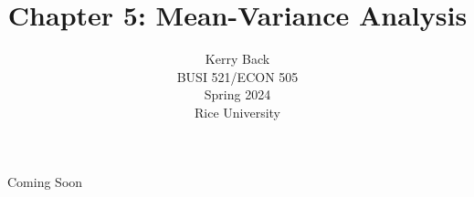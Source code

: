 \documentclass[10pt]{beamer}
\title{Chapter 5: Mean-Variance Analysis}
\date{}
\author{Kerry Back\\ 
BUSI 521/ECON 505\\
Spring 2024\\
Rice University}
\begin{document}
\maketitle

\begin{frame}[plain]
    \Large Coming Soon
\end{frame}
\end{document}
